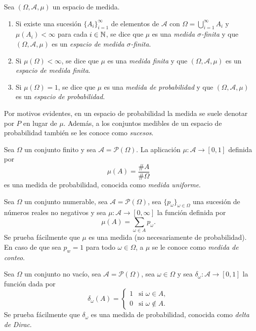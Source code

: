 \documentclass[a4paper, 11pt, extrafontsizes]{memoir}
\begin{document}
\begin{definition}
    Sea $(\Omega, \mathcal{A}, \mu)$ un espacio de medida.
    \begin{enumerate}
        \item Si existe una sucesión $\{A_i\}_{i=1}^\infty$ de elementos de $\mathcal{A}$ con $\Omega = \bigcup_{i=1}^\infty A_i$ y $\mu(A_i) < \infty$ para cada $i \in \mathbb N$, se dice que $\mu$ es una \emph{medida $\sigma$-finita} y que $(\Omega,\mathcal{A},\mu)$ es un \emph{espacio de medida $\sigma$-finita}.
        \item Si $\mu(\Omega) < \infty$, se dice que $\mu$ es una \emph{medida finita} y que $(\Omega,\mathcal{A},\mu)$ es un \emph{espacio de medida finita}.
        \item Si $\mu(\Omega) = 1$, se dice que $\mu$ es una \emph{medida de probabilidad} y que $(\Omega,\mathcal{A},\mu)$ es un \emph{espacio de probabilidad}.
    \end{enumerate}
\end{definition}

Por motivos evidentes, en un espacio de probabilidad la medida se suele denotar por $P$ en lugar de $\mu$. Además, a los conjuntos medibles de un espacio de probabilidad también se les conoce como \emph{sucesos}.

\begin{example}
    Sea $\Omega$ un conjunto finito y sea $\mathcal{A} = \mathcal{P}(\Omega)$. La aplicación $\mu \colon \mathcal{A} \to [0,1]$ definida por
    \[\mu(A)= \frac{\#A}{\#\Omega}\]
    es una medida de probabilidad, conocida como \emph{medida uniforme}.
\end{example}

\begin{example}
    Sea $\Omega$ un conjunto numerable, sea $\mathcal{A} = \mathcal{P}(\Omega)$, sea $\{p_\omega\}_{\omega \in \Omega}$ una sucesión de números reales no negativos y sea $\mu \colon \mathcal{A} \to [0,\infty]$ la función definida por
    \[\mu(A) = \sum_{\omega \in A}p_\omega.\]
    Se prueba fácilmente que $\mu$ es una medida (no necesariamente de probabilidad). En caso de que sea $p_w = 1$ para todo $\omega \in \Omega$, a $\mu$ se le conoce como \textit{{medida de conteo}}.
\end{example}

\begin{example}\label{eje:1.1.7}
    Sea $\Omega$ un conjunto no vacío, sea $\mathcal{A} = \mathcal{P}(\Omega)$, sea $\omega \in \Omega$ y sea $\delta_\omega \colon \mathcal{A} \to [0,1]$ la función dada por
    \[\delta_\omega(A) = \begin{cases}
        1 & \text{si } \omega \in A, \\
        0 & \text{si } \omega \not\in A.
    \end{cases}\]
    Se prueba fácilmente que $\delta_\omega$ es una medida de probabilidad, conocida como \textit{delta de Dirac}.
\end{example}
\end{document}
